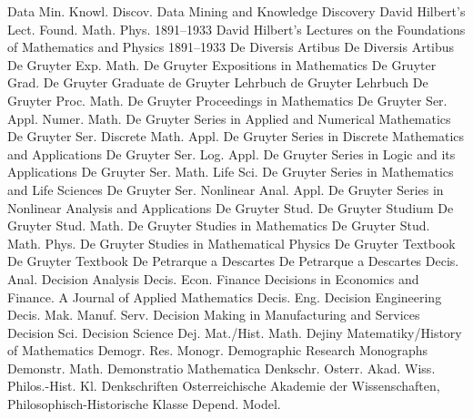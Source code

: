 {Data Min. Knowl. Discov.}
{Data Mining and Knowledge Discovery}
{David Hilbert's Lect. Found. Math. Phys. 1891--1933}
{David Hilbert's Lectures on the Foundations of Mathematics and Physics 1891--1933}
{De Diversis Artibus}
{De Diversis Artibus}
{De Gruyter Exp. Math.}
{De Gruyter Expositions in Mathematics}
{De Gruyter Grad.}
{De Gruyter Graduate}
{de Gruyter Lehrbuch}
{de Gruyter Lehrbuch}
{De Gruyter Proc. Math.}
{De Gruyter Proceedings in Mathematics}
{De Gruyter Ser. Appl. Numer. Math.}
{De Gruyter Series in Applied and Numerical Mathematics}
{De Gruyter Ser. Discrete Math. Appl.}
{De Gruyter Series in Discrete Mathematics and Applications}
{De Gruyter Ser. Log. Appl.}
{De Gruyter Series in Logic and its Applications}
{De Gruyter Ser. Math. Life Sci.}
{De Gruyter Series in Mathematics and Life Sciences}
{De Gruyter Ser. Nonlinear Anal. Appl.}
{De Gruyter Series in Nonlinear Analysis and Applications}
{De Gruyter Stud.}
{De Gruyter Studium}
{De Gruyter Stud. Math.}
{De Gruyter Studies in Mathematics}
{De Gruyter Stud. Math. Phys.}
{De Gruyter Studies in Mathematical Physics}
{De Gruyter Textbook}
{De Gruyter Textbook}
{De Petrarque a Descartes}
{De Petrarque a Descartes}
{Decis. Anal.}
{Decision Analysis}
{Decis. Econ. Finance}
{Decisions in Economics and Finance. A Journal of Applied Mathematics}
{Decis. Eng.}
{Decision Engineering}
{Decis. Mak. Manuf. Serv.}
{Decision Making in Manufacturing and Services}
{Decision Sci.}
{Decision Science}
{Dej. Mat./Hist. Math.}
{Dejiny Matematiky/History of Mathematics}
{Demogr. Res. Monogr.}
{Demographic Research Monographs}
{Demonstr. Math.}
{Demonstratio Mathematica}
{Denkschr. Osterr. Akad. Wiss. Philos.-Hist. Kl.}
{Denkschriften Osterreichische Akademie der Wissenschaften, Philosophisch-Historische Klasse}
{Depend. Model.}
